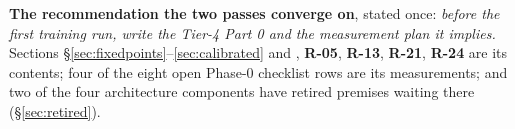 \textbf{The recommendation the two passes converge on}, stated once:
\emph{before the first training run, write the Tier-4 Part 0 and the
measurement plan it implies.} Sections \S\ref{sec:fixedpoints}--\ref{sec:calibrated}
and , \textbf{R-05}, \textbf{R-13}, \textbf{R-21}, \textbf{R-24} are
its contents; four of the eight
open Phase-0 checklist rows are its measurements; and two of the four
architecture components have retired premises waiting there
(\S\ref{sec:retired}).
